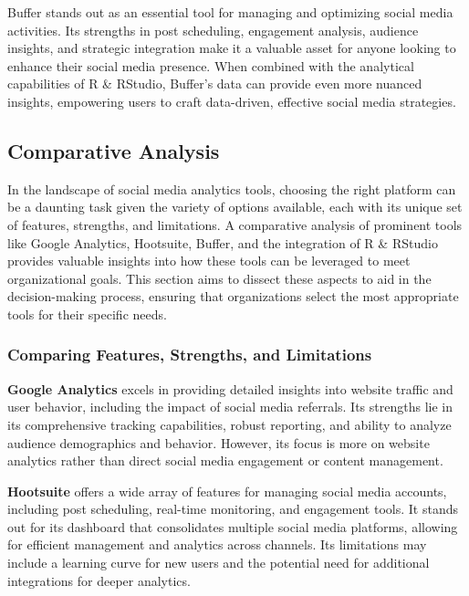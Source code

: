 \documentclass[
]{book}
\begin{document}
Buffer stands out as an essential tool for managing and optimizing social media activities. Its strengths in post scheduling, engagement analysis, audience insights, and strategic integration make it a valuable asset for anyone looking to enhance their social media presence. When combined with the analytical capabilities of R \& RStudio, Buffer's data can provide even more nuanced insights, empowering users to craft data-driven, effective social media strategies.

\hypertarget{comparative-analysis-1}{%
\subsection*{Comparative Analysis}\label{comparative-analysis-1}}

In the landscape of social media analytics tools, choosing the right platform can be a daunting task given the variety of options available, each with its unique set of features, strengths, and limitations. A comparative analysis of prominent tools like Google Analytics, Hootsuite, Buffer, and the integration of R \& RStudio provides valuable insights into how these tools can be leveraged to meet organizational goals. This section aims to dissect these aspects to aid in the decision-making process, ensuring that organizations select the most appropriate tools for their specific needs.

\hypertarget{comparing-features-strengths-and-limitations}{%
\subsubsection*{Comparing Features, Strengths, and Limitations}\label{comparing-features-strengths-and-limitations}}

\textbf{Google Analytics} excels in providing detailed insights into website traffic and user behavior, including the impact of social media referrals. Its strengths lie in its comprehensive tracking capabilities, robust reporting, and ability to analyze audience demographics and behavior. However, its focus is more on website analytics rather than direct social media engagement or content management.

\textbf{Hootsuite} offers a wide array of features for managing social media accounts, including post scheduling, real-time monitoring, and engagement tools. It stands out for its dashboard that consolidates multiple social media platforms, allowing for efficient management and analytics across channels. Its limitations may include a learning curve for new users and the potential need for additional integrations for deeper analytics.
\end{document}
